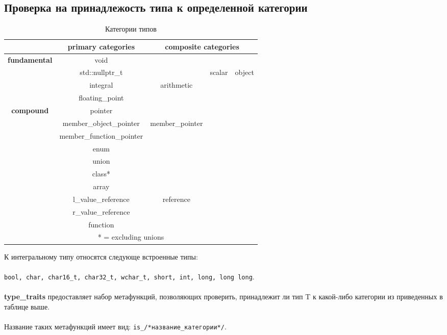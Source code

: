 \subsection{Проверка на принадлежость типа к определенной категории}
\begin{table}[H]
	\caption{\label{tab:types} Категории типов}
	\begin{center}
\begin{tabular}{|c|c|c|c|c|}
	\hline 
	& \textbf{primary categories} & \multicolumn{3}{|c|}{\textbf{composite categories}} \\ 
	\hline 
	\multirow{4}{*}{\textbf{fundamental}} & void &  &  &  \\ 
	\cline{2-5}
	& std::nullptr\_t &  & \multirow{7}{*}{scalar} & \multirow{10}{*}{object} \\ 
	\cline{2-3} 
	& integral & \multirow{2}{*}{arithmetic} &  & \\ 
	\cline{2-2} 
	& floating\_point  &  &  &  \\ 
	\cline{1-3} 
	\multirow{10}{*}{\textbf{compound}}& pointer &  &  &  \\ 
	\cline{2-3} 
	& member\_object\_pointer  & \multirow{2}{*}{member\_pointer}  &  &  \\ 
	\cline{2-2} 
	& member\_function\_pointer  &  &  &  \\ 
	\cline{2-3} 
	& enum &  &  &  \\ 
	\cline{2-4} 
	& union &  &  &  \\ 
	\cline{2-4} 
	& class* &  &  &  \\ 
	\cline{2-4} 
	& array &  &  &  \\ 
	\cline{2-5} 
	& l\_value\_reference  & \multirow{2}{*}{reference} &  &  \\ 
	\cline{2-2} \cline{4-5} 
	& r\_value\_reference &  &  &  \\ 
	\cline{2-5} 
	& function  &  &  &  \\ 
	\cline{1-5} 
	\multicolumn{5}{|c|}{* = excluding unions} \\ 
	\hline 
\end{tabular}
\end{center}
\end{table}
К интегральному типу относятся следующе встроенные типы:\\\\
\texttt{bool, char, char16\_t, char32\_t, wchar\_t, short, int, long, long long}. \\\\
\textbf{type\_traits} предоставляет набор метафункций, позволяющих проверить, принадлежит ли тип T к какой-либо категории из приведенных в таблице выше. \\\\
Название таких метафункций имеет вид: \texttt{is\_/*название\_категории*/}.

